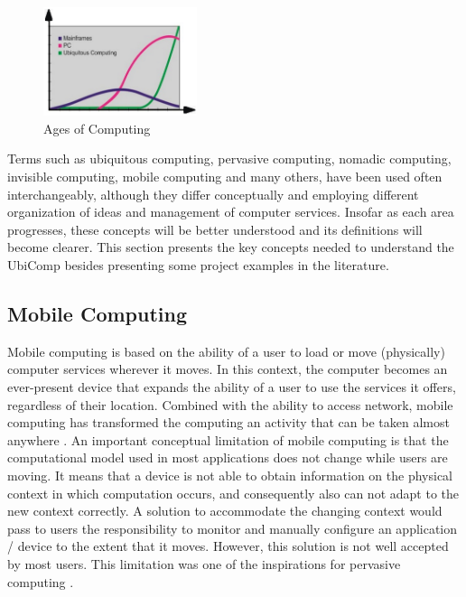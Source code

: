 \documentclass{acm_proc_article-sp}
\begin{document}
\begin{figure}[h]
\centering
    \includegraphics[width=0.4\textwidth,natwidth=610,natheight=642]{pictures/era.png}
    \caption{Ages of Computing}
    \label{fig:era}
\end{figure}

Terms such as ubiquitous computing, pervasive computing, nomadic computing, invisible computing, mobile computing and many others, have been used often interchangeably, although they differ conceptually and employing different organization of ideas and management of computer services. Insofar as each area progresses, these concepts will be better understood and its definitions will become clearer. This section presents the key concepts needed to understand the UbiComp besides presenting some project examples in the literature.

\subsection{Mobile Computing}
Mobile computing is based on the ability of a user to load or move (physically) computer services wherever it moves. In this context, the computer becomes an ever-present device that expands the ability of a user to use the services it offers, regardless of their location. Combined with the ability to access network, mobile computing has transformed the computing an activity that can be taken almost anywhere \cite{netodesenvolvimento}.
\newline
\newline
An important conceptual limitation of mobile computing is that the computational model used in most applications does not change while users are moving. It means that a device is not able to obtain information on the physical context in which computation occurs, and consequently also can not adapt to the new context correctly. A solution to accommodate the changing context would pass to users the responsibility to monitor and manually configure an application / device to the extent that it moves. However, this solution is not well accepted by most users. This limitation was one of the inspirations for pervasive computing .
\end{document}
